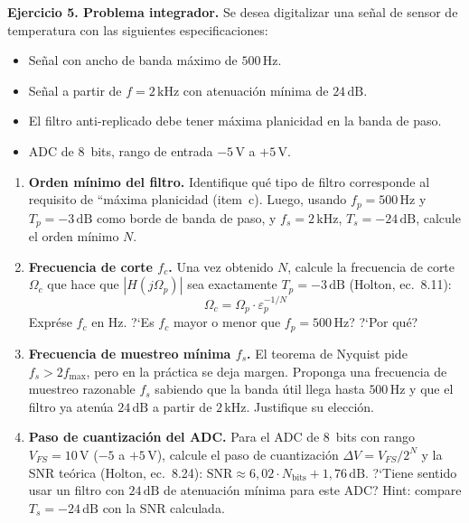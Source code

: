 \documentclass[11pt, a4paper]{article}
\begin{document}
\begin{exbox}
\textbf{Ejercicio 5. Problema integrador.}
Se desea digitalizar una se\~nal de sensor de temperatura con las siguientes especificaciones:
\begin{itemize}[noitemsep]
  \item[\textbf{i.}] Se\~nal con ancho de banda m\'aximo de $500\,\text{Hz}$.
  \item[\textbf{ii.}] Se\~nal a partir de $f = 2\,\text{kHz}$ con atenuaci\'on m\'inima de $24\,\text{dB}$.
  \item[\textbf{iii.}] El filtro anti-replicado debe tener m\'axima planicidad en la banda de paso.
  \item[\textbf{iv.}] ADC de 8~bits, rango de entrada $-5\,\text{V}$ a $+5\,\text{V}$.
\end{itemize}

\begin{enumerate}[label=\textbf{(\alph*)}]
  \item \textbf{Orden m\'inimo del filtro.}
  Identifique qu\'e tipo de filtro corresponde al requisito de ``m\'axima planicidad (item~c).
  Luego, usando $f_p = 500\,\text{Hz}$ y $T_p = -3\,\text{dB}$ como borde de banda de paso,
  y $f_s = 2\,\text{kHz}$, $T_s = -24\,\text{dB}$, calcule el orden m\'inimo $N$.

  \item \textbf{Frecuencia de corte $f_c$.}
  Una vez obtenido $N$, calcule la frecuencia de corte $\Omega_c$ que hace que $|H(j\Omega_p)|$
  sea exactamente $T_p = -3\,\text{dB}$ (Holton, ec.~8.11):
  $$\Omega_c = \Omega_p \cdot \varepsilon_p^{-1/N}$$
  Expr\'ese $f_c$ en Hz. ?`Es $f_c$ mayor o menor que $f_p = 500\,\text{Hz}$? ?`Por qu\'e?

  \item \textbf{Frecuencia de muestreo m\'inima $f_s$.}
  El teorema de Nyquist pide $f_s > 2 f_{\max}$, pero en la pr\'actica se deja margen.
  Proponga una frecuencia de muestreo razonable $f_s$ sabiendo que la banda \'util llega
  hasta $500\,\text{Hz}$ y que el filtro ya aten\'ua $24\,\text{dB}$ a partir de $2\,\text{kHz}$.
  Justifique su elecci\'on.

  \item \textbf{Paso de cuantizaci\'on del ADC.}
  Para el ADC de 8~bits con rango $V_{FS} = 10\,\text{V}$ ($-5$ a $+5\,\text{V}$),
  calcule el paso de cuantizaci\'on $\Delta V = V_{FS}/2^N$ y la SNR te\'orica
  (Holton, ec.~8.24): $\mathrm{SNR} \approx 6{,}02 \cdot N_{\text{bits}} + 1{,}76\,\text{dB}$.
  ?`Tiene sentido usar un filtro con $24\,\text{dB}$ de atenuaci\'on m\'inima para este ADC?
  Hint: compare $T_s = -24\,\text{dB}$ con la SNR calculada.
\end{enumerate}
\end{exbox}
\end{document}
